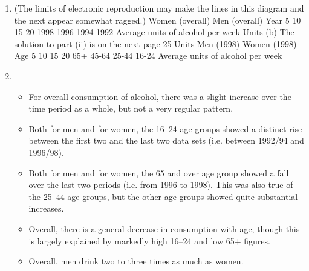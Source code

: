 \documentclass[a4paper,12pt]{article}
\begin{document}
\begin{enumerate}

\item 
(The limits of electronic reproduction may make the lines in this diagram and the next appear somewhat ragged.)
Women (overall)
Men (overall)
Year
5
10
15
20
1998
1996
1994
1992
Average units of alcohol per week
Units
(b)
The solution to part (ii) is on the next page
25
Units
Men (1998)
Women (1998)
Age
5
10
15
20
65+
45-64
25-44
16-24
Average units of alcohol per week
\item 

\begin{itemize}
    \item For overall consumption of alcohol, there was a slight increase over the time period as a whole, but not a very regular pattern.
\item Both for men and for women, the 16–24 age groups showed a distinct rise between the first two and the last two data sets (i.e. between 1992/94 and 1996/98).
\item Both for men and for women, the 65 and over age group showed a fall over the last two periods (i.e. from 1996 to 1998). This was also true of the 25–44 age groups, but the other age groups showed quite substantial increases.
\item Overall, there is a general decrease in consumption with age, though this is largely explained by markedly high 16–24 and low 65+ figures.
\item Overall, men drink two to three times as much as women.
\end{itemize}

\end{enumerate}
\end{document}
